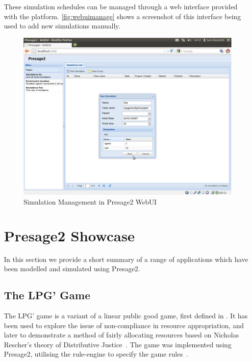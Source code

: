 These simulation schedules can be managed through a web interface provided with
the platform. \autoref{fig:webuimanage} shows a screenshot of this interface
being used to add new simulations manually.

\begin{figure}
\caption{Simulation Management in Presage2 WebUI}\label{fig:webuimanage}
\includegraphics[width=\linewidth]{gfx/presage2/webui_manage}
\end{figure}

\section{Presage2 Showcase}

In this section we provide a short summary of a range of applications which have
been modelled and simulated using Presage2.

\subsection{The LPG' Game}

The LPG' game is a variant of a linear public good game, first defined in
\citet{Pitt2012c}. It has been used to explore the issue of non-compliance in
resource appropriation, and later to demonstrate a method of fairly allocating
resources based on Nicholas Rescher's theory of Distributive
Justice~\citep{Pitt2014}. The game was implemented using Presage2, utilising
the rule-engine to specify the game rules~\citep{Macbeth2012}.

